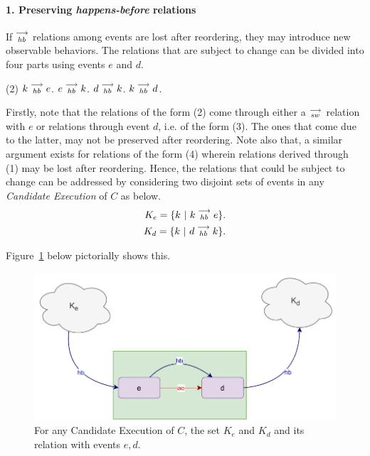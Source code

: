 
\paragraph{1. Preserving \textit{happens-before} relations}
        
    If $\stackrel{\longrightarrow}{_{hb}}$ relations among events are lost after reordering, they may introduce new observable behaviors. The relations that are subject to change can be divided into four parts using events $e$ and $d$.
    \begin{tasks}[style=enumerate](2)
        \task $k\stackrel{\longrightarrow}{_{hb}}e$.
        \task $e\stackrel{\longrightarrow}{_{hb}}k$.
        \task $d\stackrel{\longrightarrow}{_{hb}}k$.
        \task $k\stackrel{\longrightarrow}{_{hb}}d$.
    \end{tasks}

    Firstly, note that the relations of the form (2) come through either a $\stackrel{\longrightarrow}{_{sw}}$ relation with $e$ or relations through event $d$, i.e. of the form (3). 
    The ones that come due to the latter, may not be preserved after reordering. 
    Note also that, a similar argument exists for relations of the form (4) wherein relations derived through (1) may be lost after reordering. 
    Hence, the relations that could be subject to change can be addressed by considering two disjoint sets of events in any \textit{Candidate Execution} of $C$ as below.
    \begin{align*}
       K_e = \{k \ | \ k\stackrel{\longrightarrow}{_{hb}}e \}. \\
       K_d = \{k \ | \ d\stackrel{\longrightarrow}{_{hb}}k \}. 
    \end{align*}

    Figure~\ref{reord:preserve_hb(a)} below pictorially shows this.
    \begin{figure}[H]
        \centering
        \includegraphics[scale=0.7]{4.InstructionReordering/4.ValidReorderingCandidate/ProofParts/Part1/part1(a).pdf}
        \caption{For any Candidate Execution of $C$, the set $K_e$ and $K_d$ and its relation with events $e,d$.}
        \label{reord:preserve_hb(a)}
    \end{figure}
  
